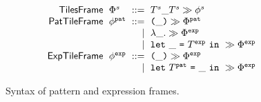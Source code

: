 \begin{figure}
  \vspace{-3px}
  \[
  \arraycolsep=3pt\begin{array}{rlrl}
      \mathsf{TilesFrame} & \tframe^s & ::= & \tframelit{\tiles^s\_\tiles^s}{\tfrelem^s} \\
      \mathsf{PatTileFrame} & \tfrelem^{\pat} & ::= &
        \tframelit{\sparen{\_}}{\tframe^{\pat}} \\
      & & \vert &
        \tframelit{\slam{\_}{}}{\tframe^{\expr}} \\
      & & \vert &
        \tframelit{\slet{\_}{\tiles^{\expr}}{}}{\tframe^{\expr}} \\
      \mathsf{ExpTileFrame} & \tfrelem^{\expr} & ::= &
        \tframelit{\sparen{\_}}{\tframe^{\expr}} \\
      & & \vert &
        \tframelit{\slet{\tiles^{\pat}}{\_}{}}{\tframe^{\expr}}
  \end{array}\]
  \caption{
    Syntax of pattern and expression frames.
  }
  \label{fig:tile-syntax}
\end{figure}
